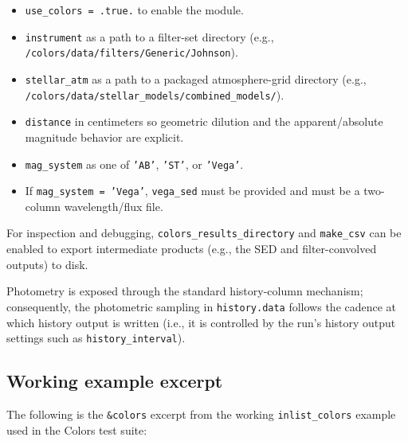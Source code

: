 \documentclass[linenumbers,apj,twocolumn, floatfix]{aastex701}
\begin{document}
\begin{itemize}
  \item \texttt{use\_colors = .true.} to enable the module.
  \item \texttt{instrument} as a path to a filter-set directory (e.g., \texttt{/colors/data/filters/Generic/Johnson}).
  \item \texttt{stellar\_atm} as a path to a packaged atmosphere-grid directory (e.g., \texttt{/colors/data/stellar\_models/combined\_models/}).
  \item \texttt{distance} in centimeters so geometric dilution and the apparent/absolute magnitude behavior are explicit.
  \item \texttt{mag\_system} as one of \texttt{'AB'}, \texttt{'ST'}, or \texttt{'Vega'}.
  \item If \texttt{mag\_system = 'Vega'}, \texttt{vega\_sed} must be provided and must be a two-column wavelength/flux file.
\end{itemize}

For inspection and debugging, \texttt{colors\_results\_directory} and \texttt{make\_csv} can be enabled to export intermediate products (e.g., the SED and filter-convolved outputs) to disk.

Photometry is exposed through the standard history-column mechanism; consequently, the photometric sampling in \texttt{history.data} follows the cadence at which history output is written (i.e., it is controlled by the run's history output settings such as \texttt{history\_interval}).

\subsection{Working example excerpt}

The following is the \texttt{\&colors} excerpt from the working \texttt{inlist\_colors} example used in the Colors test suite:
\end{document}
